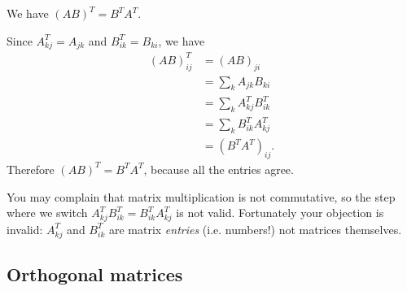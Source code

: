 \documentclass{article}
\begin{document}
\begin{Lemma}
We have \((AB)^T=B^TA^T\).
\end{Lemma}
\begin{Proof}
Since \(A^T_{kj}=A_{jk}\) and \(B^T_{ik}=B_{ki}\), we have
\begin{align*}
(AB)^T_{ij}&=(AB)_{ji}\\
&=\sum_kA_{jk}B_{ki}\\
&=\sum_k A^T_{kj}B^T_{ik}\\
&=\sum_k B^T_{ik}A^T_{kj}\\
&=(B^TA^T)_{ij}.
\end{align*}
Therefore \((AB)^T=B^TA^T\), because all the entries agree. \qedhere


\end{Proof}
\begin{Remark}
You may complain that matrix multiplication is not commutative, so
the step where we switch \(A^T_{kj}B^T_{ik}=B^T_{ik}A^T_{kj}\) is
not valid. Fortunately your objection is invalid: \(A^T_{kj}\) and
\(B^T_{ik}\) are matrix {\em entries} (i.e. numbers!) not matrices
themselves.


\end{Remark}
\subsection{Orthogonal matrices}
\end{document}
